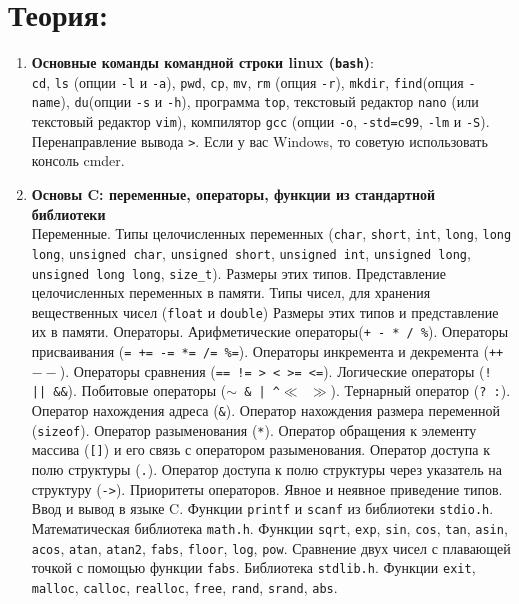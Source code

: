 \documentclass{article}
\begin{document}

\section*{Теория:}
\begin{enumerate}
\item \textbf{Основные команды командной строки linux (\texttt{bash})}:\\
 \texttt{cd}, \texttt{ls} (опции \texttt{-l} и \texttt{-a}), \texttt{pwd}, \texttt{cp}, \texttt{mv}, \texttt{rm} (опция \texttt{-r}), \texttt{mkdir}, \texttt{find}(опция \texttt{-name}), \texttt{du}(опции \texttt{-s} и \texttt{-h}), программа \texttt{top}, текстовый редактор \texttt{nano} (или текстовый редактор \texttt{vim}), компилятор \texttt{gcc} (опции \texttt{-o}, \texttt{-std=c99}, \texttt{-lm} и \texttt{-S}). Перенаправление вывода \texttt{>}. Если у вас Windows, то советую использовать консоль cmder.

\item \textbf{Основы C: переменные, операторы, функции из стандартной библиотеки}\\
Переменные. Типы целочисленных переменных (\texttt{char}, \texttt{short}, \texttt{int}, \texttt{long}, \texttt{long long}, \texttt{unsigned char}, \texttt{unsigned short}, \texttt{unsigned int}, \texttt{unsigned long}, \texttt{unsigned long long}, \texttt{size\_t}). Размеры этих типов. Представление целочисленных переменных в памяти. Типы чисел, для хранения вещественных чисел (\texttt{float} и \texttt{double})  Размеры этих типов и представление их в памяти. Операторы. Арифметические операторы(\texttt{+ - * / \%}). Операторы присваивания (\texttt{= += -= *= /= \%=}). Операторы инкремента и декремента (\texttt{++  $--$}). Операторы сравнения (\texttt{== != > < >= <=}). Логические операторы (\texttt{!  ||  \&\&}). Побитовые операторы (\texttt{$\sim$  \&  |  \textasciicircum \quad $\ll$  $\gg$}). Тернарный оператор (\texttt{? :}). Оператор нахождения адреса (\texttt{\&}). Оператор нахождения размера переменной (\texttt{sizeof}). Оператор разыменования (\texttt{*}). Оператор обращения к элементу массива (\texttt{[]}) и его связь с оператором разыменования. Оператор доступа к полю структуры (\texttt{.}). Оператор доступа к полю структуры через указатель на структуру (\texttt{->}). Приоритеты операторов. Явное и неявное приведение типов. Ввод и вывод в языке C. Функции \texttt{printf} и \texttt{scanf} из библиотеки \texttt{stdio.h}. Математическая библиотека \texttt{math.h}. Функции \texttt{sqrt}, \texttt{exp}, \texttt{sin}, \texttt{cos}, \texttt{tan}, \texttt{asin}, \texttt{acos}, \texttt{atan}, \texttt{atan2}, \texttt{fabs}, \texttt{floor}, \texttt{log}, \texttt{pow}. Сравнение двух чисел с плавающей точкой с помощью функции \texttt{fabs}. Библиотека \texttt{stdlib.h}. Функции \texttt{exit}, \texttt{malloc}, \texttt{calloc}, \texttt{realloc}, \texttt{free}, \texttt{rand}, \texttt{srand}, \texttt{abs}.


\end{enumerate}
\end{document}
